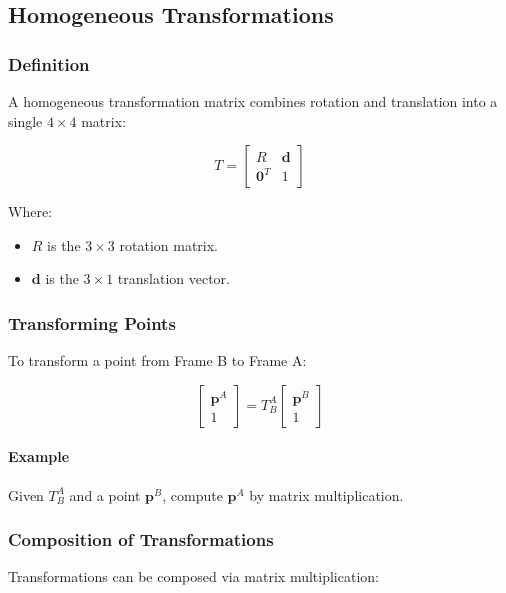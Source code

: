 \documentclass{article}
\begin{document}
\subsection{Homogeneous Transformations}

\subsubsection{Definition}

A homogeneous transformation matrix combines rotation and translation into a single $4 \times 4$ matrix:

$$
T = \begin{bmatrix}
R & \mathbf{d} \\
\mathbf{0}^T & 1
\end{bmatrix}
$$

Where:

\begin{itemize}
    \item $R$ is the $3 \times 3$ rotation matrix.
    \item $\mathbf{d}$ is the $3 \times 1$ translation vector.
\end{itemize}

\subsubsection{Transforming Points}

To transform a point from Frame B to Frame A:

$$
\begin{bmatrix}
\mathbf{p}^A \\
1
\end{bmatrix}
= T^A_B \begin{bmatrix}
\mathbf{p}^B \\
1
\end{bmatrix}
$$

\paragraph{Example}

Given $T^A_B$ and a point $\mathbf{p}^B$, compute $\mathbf{p}^A$ by matrix multiplication.

\subsubsection{Composition of Transformations}

Transformations can be composed via matrix multiplication:
\end{document}
